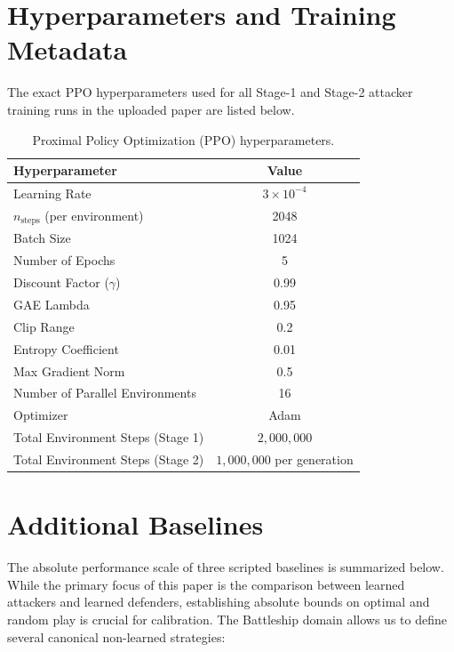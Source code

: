 \documentclass[11pt]{article}
\begin{document}
\section{Hyperparameters and Training Metadata}

The exact PPO hyperparameters used for all Stage-1 and Stage-2 attacker training runs in the uploaded paper are listed below.

\begin{table}[htbp]
\centering
\caption{Proximal Policy Optimization (PPO) hyperparameters.}
\begin{tabular}{lc}
\toprule
Hyperparameter & Value \\
\midrule
Learning Rate & $3 \times 10^{-4}$ \\
$n_{\mathrm{steps}}$ (per environment) & 2048 \\
Batch Size & 1024 \\
Number of Epochs & 5 \\
Discount Factor ($\gamma$) & 0.99 \\
GAE Lambda & 0.95 \\
Clip Range & 0.2 \\
Entropy Coefficient & 0.01 \\
Max Gradient Norm & 0.5 \\
Number of Parallel Environments & 16 \\
Optimizer & Adam \\
Total Environment Steps (Stage 1) & $2{,}000{,}000$ \\
Total Environment Steps (Stage 2) & $1{,}000{,}000$ per generation \\
\bottomrule
\end{tabular}
\end{table}

\clearpage
\section{Additional Baselines}

The absolute performance scale of three scripted baselines is summarized below. While the primary focus of this paper is the comparison between learned attackers and learned defenders, establishing absolute bounds on optimal and random play is crucial for calibration. The Battleship domain allows us to define several canonical non-learned strategies:
\end{document}
